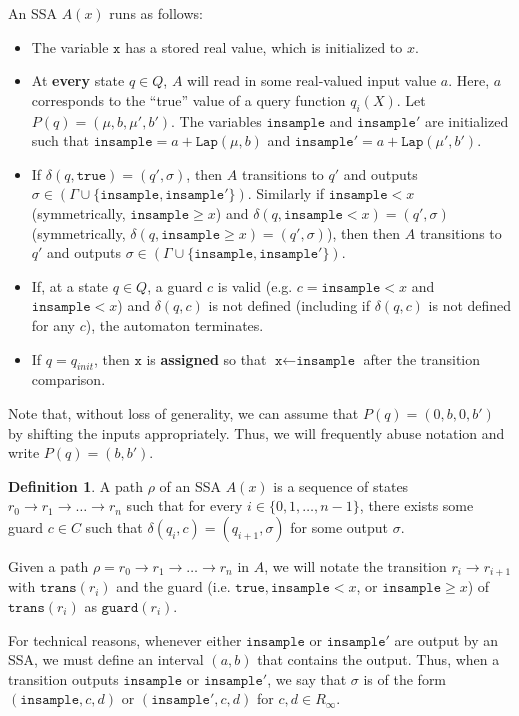 \documentclass[12pt]{article}
\newcommand{\gguard}[1][x]{\texttt{insample}\geq #1}
\newcommand{\lguard}[1][x]{\texttt{insample} < #1}
\newcommand{\guard}{\texttt{guard}}
\newcommand{\trans}{\texttt{trans}}
\newcommand{\Lap}{\texttt{Lap}}
\theoremstyle{definition}
\newtheorem{defn}[thm]{Definition}
\begin{document}
An SSA $A(x)$ runs as follows:
\begin{itemize}
    \item The variable $\texttt{x}$ has a stored real value, which is initialized to $x$. 
    \item At \textbf{every} state $q\in Q$, $A$ will read in some real-valued input value $a$. Here, $a$ corresponds to the ``true'' value of a query function $q_i(X)$. Let $P(q) = (\mu, b, \mu', b')$. 
    The variables $\texttt{insample}$ and $\texttt{insample}'$ are initialized such that $\texttt{insample} = a + \Lap(\mu, b)$ and $\texttt{insample}' = a + \Lap(\mu', b')$.
    \item If $\delta(q, \texttt{true}) = (q', \sigma)$, then $A$ transitions to $q'$ and outputs $\sigma \in(\Gamma\cup\{\texttt{insample}, \texttt{insample}'\})$. Similarly if $\lguard$ (symmetrically, $\gguard$) and $\delta(q, \lguard) = (q', \sigma)$ (symmetrically, $\delta(q, \gguard) = (q', \sigma)$), then then $A$ transitions to $q'$ and outputs $\sigma \in(\Gamma\cup\{\texttt{insample}, \texttt{insample}'\})$.
    \item If, at a state $q\in Q$, a guard $c$ is valid (e.g. $c=\lguard$ and $\lguard$) and $\delta(q, c)$ is not defined (including if $\delta(q, c)$ is not defined for any $c$), the automaton terminates.
    \item If $q = q_{init}$, then $\texttt{x}$ is \textbf{assigned} so that $\texttt{x}\gets \texttt{insample}$ after the transition comparison.
\end{itemize}

Note that, without loss of generality, we can assume that $P(q) = (0, b, 0, b')$ by shifting the inputs appropriately. Thus, we will frequently abuse notation and write $P(q) = (b, b')$. 


\begin{defn}
    A path $\rho$ of an SSA $A(x)$ is a sequence of states $r_0\to r_1\to\ldots\to r_n$ such that for every $i\in\{0, 1,\ldots, n-1\}$, there exists some guard $c\in C$ such that $\delta(q_i, c) = (q_{i+1}, \sigma)$ for some output $\sigma$. 
\end{defn}

Given a path $\rho = r_0\to r_1\to \ldots \to r_n$ in $A$, we will notate the transition $r_i\to r_{i+1}$ with $\trans(r_i)$ and the guard (i.e. $\texttt{true}, \lguard$, or $\gguard$) of $\trans(r_i)$ as $\guard(r_i)$. 

For technical reasons, whenever either $\texttt{insample}$ or $\texttt{insample}'$ are output by an SSA, we must define an interval $(a, b)$ that contains the output. Thus, when a transition outputs $\texttt{insample}$ or $\texttt{insample}'$, we say that $\sigma$ is of the form $(\texttt{insample}, c, d)$ or $(\texttt{insample}', c, d)$ for $c, d\in R_\infty$. 
\end{document}
